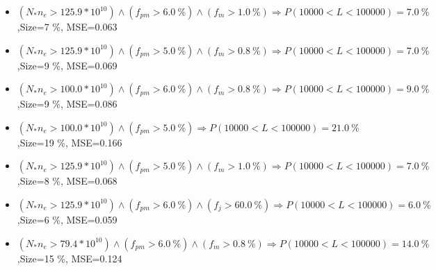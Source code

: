 \documentclass[numbered]{CSL}
\begin{document}
\begin{itemize}
\item $(N_* n_e > 125.9 * 10^{10}) \land (f_{pm} > 6.0~\%) \land (f_m > 1.0~\%) \Rightarrow P(10 000 < L < 100 000) = 7.0~\%$,\hfill Size=7 \%, MSE=0.063
\item $(N_* n_e > 125.9 * 10^{10}) \land (f_{pm} > 5.0~\%) \land (f_m > 0.8~\%) \Rightarrow P(10 000 < L < 100 000) = 7.0~\%$,\hfill Size=9 \%, MSE=0.069
\item $(N_* n_e > 100.0 * 10^{10}) \land (f_{pm} > 6.0~\%) \land (f_m > 0.8~\%) \Rightarrow P(10 000 < L < 100 000) = 9.0~\%$,\hfill Size=9 \%, MSE=0.086
\item $(N_* n_e > 100.0 * 10^{10}) \land (f_{pm} > 5.0~\%) \Rightarrow P(10 000 < L < 100 000) = 21.0~\%$,\hfill Size=19 \%, MSE=0.166
\item $(N_* n_e > 125.9 * 10^{10}) \land (f_{pm} > 5.0~\%) \land (f_m > 1.0~\%) \Rightarrow P(10 000 < L < 100 000) = 7.0~\%$,\hfill Size=8 \%, MSE=0.068
\item $(N_* n_e > 125.9 * 10^{10}) \land (f_{pm} > 6.0~\%) \land (f_j > 60.0~\%) \Rightarrow P(10 000 < L < 100 000) = 6.0~\%$,\hfill Size=6 \%, MSE=0.059
\item $(N_* n_e > 79.4 * 10^{10}) \land (f_{pm} > 6.0~\%) \land (f_m > 0.8~\%) \Rightarrow P(10 000 < L < 100 000) = 14.0~\%$,\hfill Size=15 \%, MSE=0.124
\end{itemize}
\end{document}
